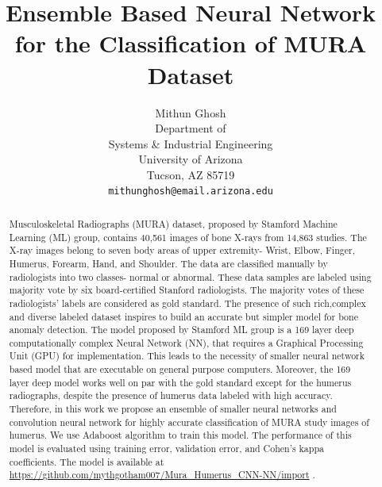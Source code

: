 \documentclass{article}
\title{Ensemble Based Neural Network for the Classification of MURA Dataset }
\author{
  Mithun Ghosh\\
  Department of \\
 Systems \& Industrial Engineering\\
  University of Arizona\\
  Tucson, AZ 85719 \\
  \texttt{mithunghosh@email.arizona.edu} }
\begin{document}
 

\maketitle

\begin{abstract}
  Musculoskeletal Radiographs (MURA) dataset, proposed by Stamford Machine Learning (ML) group, contains 40,561 images of bone X-rays from 14,863 studies.
  The X-ray images belong to seven body areas of upper extremity- Wrist, Elbow, Finger, Humerus, Forearm, Hand, and Shoulder. The data are classified manually by radiologists into two classes- normal or abnormal. 
  These data samples are labeled using majority vote by six board-certified Stanford radiologists. The majority votes of these radiologists' labels are considered as gold standard.
  The presence of such rich,complex and diverse labeled dataset inspires to build an accurate but simpler model for bone anomaly detection. 
  The model proposed by Stamford ML group is a 169 layer deep computationally complex Neural Network (NN), that requires a Graphical Processing Unit (GPU) for implementation. This leads to the necessity of smaller neural network based model that are executable on general purpose computers. Moreover, the 169 layer deep model works well on par with the gold standard except for the humerus radiographs, despite the presence of humerus data labeled with high accuracy.
  Therefore, in this work we propose an ensemble of smaller neural networks and convolution neural network for highly accurate classification of MURA study images of humerus. We use Adaboost algorithm to train this model. The performance of this model is evaluated using training error, validation error, and Cohen's kappa coefficients. The model is available at \url{https://github.com/mythgotham007/Mura_Humerus_CNN-NN/import} .
\end{abstract}
\end{document}
